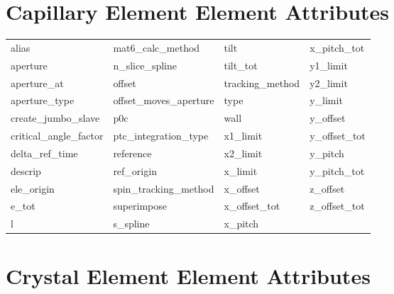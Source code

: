  \section{Capillary Element Element Attributes}
 \label{s:list.capillary}
 
 \begin{tabular}{llll} \toprule
alias                       & mat6_calc_method            & tilt                        & x_pitch_tot                 \\
aperture                    & n_slice_spline              & tilt_tot                    & y1_limit                    \\
aperture_at                 & offset                      & tracking_method             & y2_limit                    \\
aperture_type               & offset_moves_aperture       & type                        & y_limit                     \\
create_jumbo_slave          & p0c                         & wall                        & y_offset                    \\
critical_angle_factor       & ptc_integration_type        & x1_limit                    & y_offset_tot                \\
delta_ref_time              & reference                   & x2_limit                    & y_pitch                     \\
descrip                     & ref_origin                  & x_limit                     & y_pitch_tot                 \\
ele_origin                  & spin_tracking_method        & x_offset                    & z_offset                    \\
e_tot                       & superimpose                 & x_offset_tot                & z_offset_tot                \\
l                           & s_spline                    & x_pitch                     &                             \\
 \bottomrule
 \end{tabular}
 \vfill
 
 \section{Crystal Element Element Attributes}
 \label{s:list.crystal}
 
